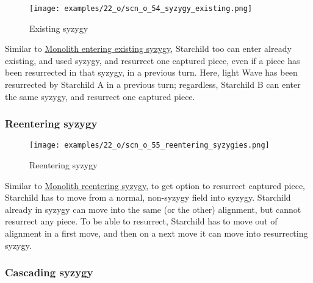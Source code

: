 \vspace*{-1.2\baselineskip}
\noindent
\begin{figure}[!h]
\texttt{[image: examples/22\_o/scn\_o\_54\_syzygy\_existing.png]}
\caption{Existing syzygy}
\label{fig:scn_o_54_syzygy_existing}
\end{figure}

Similar to \hyperref[fig:scn_d_26_syzygy_existing]{Monolith entering existing syzygy},
Starchild too can enter already existing, and used syzygy, and resurrect one captured
piece, even if a piece has been resurrected in that syzygy, in a previous turn.\newline
\indent
Here, light Wave has been resurrected by Starchild A in a previous turn; regardless,
Starchild B can enter the same syzygy, and resurrect one captured piece.

\clearpage %

\subsubsection*{Reentering syzygy}
\label{sec:One/Starchild/Syzygy/Reentering syzygy}

\vspace*{-1.2\baselineskip}
\noindent
\begin{figure}[!h]
\texttt{[image: examples/22\_o/scn\_o\_55\_reentering\_syzygies.png]}
\caption{Reentering syzygy}
\label{fig:scn_o_55_reentering_syzygies}
\end{figure}

Similar to
\hyperref[fig:scn_d_27_syzygy_reentering_same_move]{Monolith reentering syzygy},
to get option to resurrect captured piece, Starchild has to move from a normal,
non-syzygy field into syzygy. Starchild already in syzygy can move into the same
(or the other) alignment, but cannot resurrect any piece. To be able to resurrect,
Starchild has to move out of alignment in a first move, and then on a next move
it can move into resurrecting syzygy.

\clearpage %

\subsubsection*{Cascading syzygy}
\label{sec:One/Starchild/Syzygy/Cascading syzygy}

